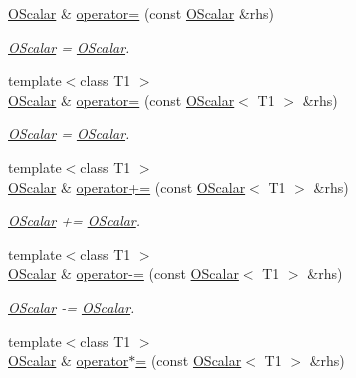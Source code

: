 \begin{DoxyCompactItemize}
\mbox{\hyperlink{classENSEM_1_1OScalar}{O\+Scalar}} \& \mbox{\hyperlink{classENSEM_1_1OScalar_a7c36649387edf21f3fa19f9ae63d4aca}{operator=}} (const \mbox{\hyperlink{classENSEM_1_1OScalar}{O\+Scalar}} \&rhs)
\begin{DoxyCompactList}\small\item\em \mbox{\hyperlink{classENSEM_1_1OScalar}{O\+Scalar}} = \mbox{\hyperlink{classENSEM_1_1OScalar}{O\+Scalar}}. \end{DoxyCompactList}\item 
{\footnotesize template$<$class T1 $>$ }\\\mbox{\hyperlink{classENSEM_1_1OScalar}{O\+Scalar}} \& \mbox{\hyperlink{classENSEM_1_1OScalar_aa6400023b45eed547bcb84c395fa1520}{operator=}} (const \mbox{\hyperlink{classENSEM_1_1OScalar}{O\+Scalar}}$<$ T1 $>$ \&rhs)
\begin{DoxyCompactList}\small\item\em \mbox{\hyperlink{classENSEM_1_1OScalar}{O\+Scalar}} = \mbox{\hyperlink{classENSEM_1_1OScalar}{O\+Scalar}}. \end{DoxyCompactList}\item 
{\footnotesize template$<$class T1 $>$ }\\\mbox{\hyperlink{classENSEM_1_1OScalar}{O\+Scalar}} \& \mbox{\hyperlink{classENSEM_1_1OScalar_a3109a05113cade86410bc77f60812023}{operator+=}} (const \mbox{\hyperlink{classENSEM_1_1OScalar}{O\+Scalar}}$<$ T1 $>$ \&rhs)
\begin{DoxyCompactList}\small\item\em \mbox{\hyperlink{classENSEM_1_1OScalar}{O\+Scalar}} += \mbox{\hyperlink{classENSEM_1_1OScalar}{O\+Scalar}}. \end{DoxyCompactList}\item 
{\footnotesize template$<$class T1 $>$ }\\\mbox{\hyperlink{classENSEM_1_1OScalar}{O\+Scalar}} \& \mbox{\hyperlink{classENSEM_1_1OScalar_a4d240e95768b5a0c9537b32d00d60ac5}{operator-\/=}} (const \mbox{\hyperlink{classENSEM_1_1OScalar}{O\+Scalar}}$<$ T1 $>$ \&rhs)
\begin{DoxyCompactList}\small\item\em \mbox{\hyperlink{classENSEM_1_1OScalar}{O\+Scalar}} -\/= \mbox{\hyperlink{classENSEM_1_1OScalar}{O\+Scalar}}. \end{DoxyCompactList}\item 
{\footnotesize template$<$class T1 $>$ }\\\mbox{\hyperlink{classENSEM_1_1OScalar}{O\+Scalar}} \& \mbox{\hyperlink{classENSEM_1_1OScalar_a9977cd15ef5da689d65713ddf0768085}{operator$\ast$=}} (const \mbox{\hyperlink{classENSEM_1_1OScalar}{O\+Scalar}}$<$ T1 $>$ \&rhs)

\end{DoxyCompactItemize}
